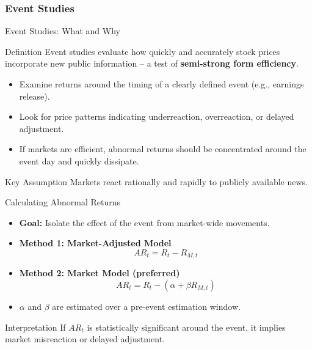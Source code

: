 \subsubsection{Event Studies}
\begin{frame}{Event Studies: What and Why}
	
	\begin{block}{Definition}
		Event studies evaluate how quickly and accurately stock prices incorporate new public information -- a test of \textbf{semi-strong form efficiency}.
	\end{block}
	
	\vspace{0.2cm}
	\begin{itemize}
		\item Examine returns around the timing of a clearly defined event (e.g., earnings release).
		\item Look for price patterns indicating underreaction, overreaction, or delayed adjustment.
		\item If markets are efficient, abnormal returns should be concentrated around the event day and quickly dissipate.
	\end{itemize}
	
	\vspace{0.2cm}
	\begin{alertblock}{Key Assumption}
		Markets react rationally and rapidly to publicly available news.
	\end{alertblock}
	
\end{frame}

\begin{frame}{Calculating Abnormal Returns}
	
	\begin{itemize}
		\item \textbf{Goal:} Isolate the effect of the event from market-wide movements.
		\item \textbf{Method 1: Market-Adjusted Model}
		\[
		AR_t = R_t - R_{M,t}
		\]
		
		\item \textbf{Method 2: Market Model (preferred)}
		\[
		AR_t = R_t - (\alpha + \beta R_{M,t})
		\]
		\item $\alpha$ and $\beta$ are estimated over a pre-event estimation window.
	\end{itemize}
	
	\vspace{0.2cm}
	\begin{block}{Interpretation}
		If $AR_t$ is statistically significant around the event, it implies market misreaction or delayed adjustment.
	\end{block}
	
\end{frame}


